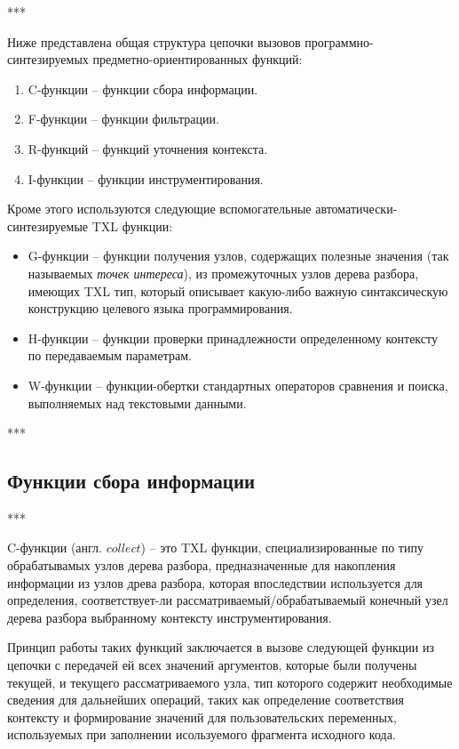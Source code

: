 ***

Ниже представлена общая структура цепочки вызовов программно-синтезируемых предметно-ориентированных функций:
\begin{enumerate}
  \item C-функции -- функции сбора информации.
  \item F-функции -- функции фильтрации.
  \item R-функций -- функций уточнения контекста.
  \item I-функции -- функции инструментирования.
\end{enumerate}

Кроме этого используются следующие вспомогательные автоматически-синтезируемые TXL функции:
\begin{itemize}
  \item G-функции -- функции получения узлов, содержащих полезные значения (так называемых \textit{точек интереса}), из промежуточных узлов дерева разбора, имеющих TXL тип, который описывает какую-либо важную синтаксическую конструкцию целевого языка программирования.
  \item H-функции -- функции проверки принадлежности определенному контексту по передаваемым параметрам.
  \item W-функции -- функции-обертки стандартных операторов сравнения и поиска, выполняемых над текстовыми данными.
\end{itemize}

***

\subsection{Функции сбора информации}

***

C-функции (англ. $collect$) -- это TXL функции, специализированные по типу обрабатывамых узлов дерева разбора, предназначенные для накопления информации из узлов древа разбора, которая впоследствии используется для определения, соответствует-ли рассматриваемый/обрабатываемый конечный узел дерева разбора выбранному контексту инструментирования.

Принцип работы таких функций заключается в вызове следующей функции из цепочки с передачей ей всех значений аргументов, которые были получены текущей, и текущего рассматриваемого узла, тип которого содержит необходимые сведения для дальнейших операций, таких как определение соответствия контексту и формирование значений для пользовательских переменных, используемых при заполнении исользуемого фрагмента исходного кода.

